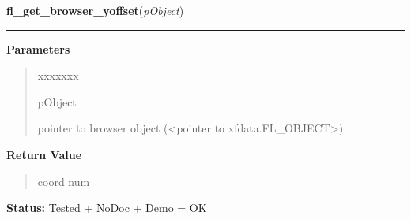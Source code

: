     \label{xformslib:library:fl_get_browser_yoffset}

    \vspace{0.5ex}

\hspace{.8\funcindent}\begin{boxedminipage}{\funcwidth}

    \raggedright \textbf{fl\_get\_browser\_yoffset}(\textit{pObject})

    \vspace{-1.5ex}

    \rule{\textwidth}{0.5\fboxrule}
\setlength{\parskip}{2ex}
\setlength{\parskip}{1ex}
      \textbf{Parameters}
      \vspace{-1ex}

      \begin{quote}
        \begin{Ventry}{xxxxxxx}

          \item[pObject]

          pointer to browser object ({\textless}pointer to 
          xfdata.FL\_OBJECT{\textgreater})

        \end{Ventry}

      \end{quote}

      \textbf{Return Value}
    \vspace{-1ex}

      \begin{quote}
      coord num

      \end{quote}

\textbf{Status:} Tested + NoDoc + Demo = OK



    \end{boxedminipage}

    \label{xformslib:library:fl_get_browser_rel_yoffset}

    \vspace{0.5ex}

